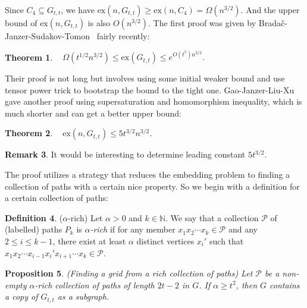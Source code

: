 \documentclass{article}
\newtheorem{theorem}{Theorem}[section]
\newtheorem{proposition}[theorem]{Proposition}
\theoremstyle{definition}
\newtheorem{remark}[theorem]{Remark}
\newtheorem{definition}[theorem]{Definition}
\newcommand{\ex}{\mathrm{ex}}
\begin{document}
Since $C_{4}\subseteq G_{t,t}$, we have $\ex(n,G_{t,t})\geq \ex(n,C_{4})=\Omega(n^{3/2})$. And the upper bound of $\ex(n,G_{t,t})$ is also $O(n^{3/2})$. The first proof was given by Brada\v{c}-Janzer-Sudakov-Tomon~\cite{bradavc2023turan} fairly recently:

\begin{theorem}~\cite{bradavc2023turan}
    $\Omega(t^{1/2}n^{3/2})\leq \ex(G_{t,t})\leq e^{O(t^{5})n^{3/2}}$.
\end{theorem}

Their proof is not long but involves using some initial weaker bound and use tensor power trick to bootstrap the bound to the tight one. Gao-Janzer-Liu-Xu~\cite{gao2023extremal} gave another proof using supersaturation and homomorphism inequality, which is much shorter and can get a better upper bound:

\begin{theorem}~\cite{gao2023extremal}
    $\ex(n,G_{t,t})\leq 5t^{3/2}n^{3/2}$.
\end{theorem}

\begin{remark}
    It would be interesting to determine leading constant $5t^{3/2}$.
\end{remark}

The proof utilizes a strategy that reduces the embedding problem to finding a collection of paths with a certain nice property. So we begin with a definition for a certain collection of paths:

\begin{definition}($\alpha$-rich)
    Let $\alpha>0$ and $k\in\mathbb{N}$. We say that a collection $\mathcal{P}$ of (labelled) paths $P_{k}$ is \emph{$\alpha$-rich} if for any member $x_1x_2\cdots x_k\in\mathcal{P}$ and any $2\leq i\leq k-1$, there exist at least $\alpha$ distinct vertices $x_i'$ such that $x_1x_2\cdots x_{i-1}x_i'x_{i+1}\cdots x_k\in \mathcal{P}$.
\end{definition}

\begin{proposition} (Finding a grid from a rich collection of paths)
    Let $\mathcal{P}$ be a non-empty $\alpha$-rich collection of paths of length $2t-2$ in $G$.
    If $\alpha \ge  t^2$, then $G$ contains a copy of $G_{t,t}$ as a subgraph. 
\end{proposition}
\end{document}
